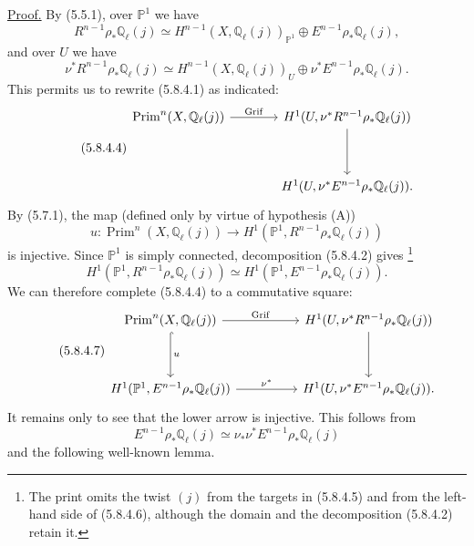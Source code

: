 \underline{Proof.}
By (5.5.1), over $\mathbb P^1$ we have
\begin{equation}\tag{5.8.4.2}
R^{n-1}\rho_*\mathbb Q_\ell(j)
\simeq
H^{n-1}(X,\mathbb Q_\ell(j))_{\mathbb P^1}
\oplus E^{n-1}\rho_*\mathbb Q_\ell(j),
\end{equation}
and over $U$ we have
\begin{equation}\tag{5.8.4.3}
\nu^*R^{n-1}\rho_*\mathbb Q_\ell(j)
\simeq
H^{n-1}(X,\mathbb Q_\ell(j))_U
\oplus \nu^*E^{n-1}\rho_*\mathbb Q_\ell(j).
\end{equation}
This permits us to rewrite (5.8.4.1) as indicated:
\begin{equation}\tag{5.8.4.4}
\begin{tikzcd}[row sep=huge,column sep=large]
\operatorname{Prim}^n(X,\mathbb Q_\ell(j))
  \arrow[r,"\operatorname{Grif}"]
&
H^1(U,\nu^*R^{n-1}\rho_*\mathbb Q_\ell(j))
  \arrow[d]
\\
{}
&
H^1(U,\nu^*E^{n-1}\rho_*\mathbb Q_\ell(j)).
\end{tikzcd}
\end{equation}
By (5.7.1), the map (defined only by virtue of hypothesis (A))
\begin{equation}\tag{5.8.4.5}
u:\operatorname{Prim}^n(X,\mathbb Q_\ell(j))
\longrightarrow
H^1(\mathbb P^1,R^{n-1}\rho_*\mathbb Q_\ell(j))
\end{equation}
is injective.  Since $\mathbb P^1$ is simply connected, decomposition
(5.8.4.2) gives
\footnote{The print omits the twist $(j)$ from the targets in (5.8.4.5)
and from the left-hand side of (5.8.4.6), although the domain and the
decomposition (5.8.4.2) retain it.}
\begin{equation}\tag{5.8.4.6}
H^1(\mathbb P^1,R^{n-1}\rho_*\mathbb Q_\ell(j))
\simeq
H^1(\mathbb P^1,E^{n-1}\rho_*\mathbb Q_\ell(j)).
\end{equation}
We can therefore complete (5.8.4.4) to a commutative square:
\begin{equation}\tag{5.8.4.7}
\begin{tikzcd}[column sep=huge,row sep=huge]
\operatorname{Prim}^n(X,\mathbb Q_\ell(j))
  \arrow[r,"\operatorname{Grif}"]
  \arrow[d,hook,"u"]
&
H^1(U,\nu^*R^{n-1}\rho_*\mathbb Q_\ell(j))
  \arrow[d]
\\
H^1(\mathbb P^1,E^{n-1}\rho_*\mathbb Q_\ell(j))
  \arrow[r,"\nu^*"]
&
H^1(U,\nu^*E^{n-1}\rho_*\mathbb Q_\ell(j)).
\end{tikzcd}
\end{equation}
It remains only to see that the lower arrow is injective.  This follows from
\begin{equation}\tag{5.8.4.8}
E^{n-1}\rho_*\mathbb Q_\ell(j)
\simeq
\nu_*\nu^*E^{n-1}\rho_*\mathbb Q_\ell(j)
\end{equation}
and the following well-known lemma.


